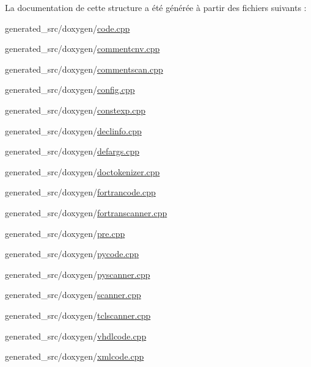 La documentation de cette structure a été générée à partir des fichiers suivants \+:\begin{DoxyCompactItemize}
\item 
generated\+\_\+src/doxygen/\hyperlink{code_8cpp}{code.\+cpp}\item 
generated\+\_\+src/doxygen/\hyperlink{commentcnv_8cpp}{commentcnv.\+cpp}\item 
generated\+\_\+src/doxygen/\hyperlink{commentscan_8cpp}{commentscan.\+cpp}\item 
generated\+\_\+src/doxygen/\hyperlink{config_8cpp}{config.\+cpp}\item 
generated\+\_\+src/doxygen/\hyperlink{constexp_8cpp}{constexp.\+cpp}\item 
generated\+\_\+src/doxygen/\hyperlink{declinfo_8cpp}{declinfo.\+cpp}\item 
generated\+\_\+src/doxygen/\hyperlink{defargs_8cpp}{defargs.\+cpp}\item 
generated\+\_\+src/doxygen/\hyperlink{doctokenizer_8cpp}{doctokenizer.\+cpp}\item 
generated\+\_\+src/doxygen/\hyperlink{fortrancode_8cpp}{fortrancode.\+cpp}\item 
generated\+\_\+src/doxygen/\hyperlink{fortranscanner_8cpp}{fortranscanner.\+cpp}\item 
generated\+\_\+src/doxygen/\hyperlink{pre_8cpp}{pre.\+cpp}\item 
generated\+\_\+src/doxygen/\hyperlink{pycode_8cpp}{pycode.\+cpp}\item 
generated\+\_\+src/doxygen/\hyperlink{pyscanner_8cpp}{pyscanner.\+cpp}\item 
generated\+\_\+src/doxygen/\hyperlink{scanner_8cpp}{scanner.\+cpp}\item 
generated\+\_\+src/doxygen/\hyperlink{tclscanner_8cpp}{tclscanner.\+cpp}\item 
generated\+\_\+src/doxygen/\hyperlink{vhdlcode_8cpp}{vhdlcode.\+cpp}\item 
generated\+\_\+src/doxygen/\hyperlink{xmlcode_8cpp}{xmlcode.\+cpp}\end{DoxyCompactItemize}
